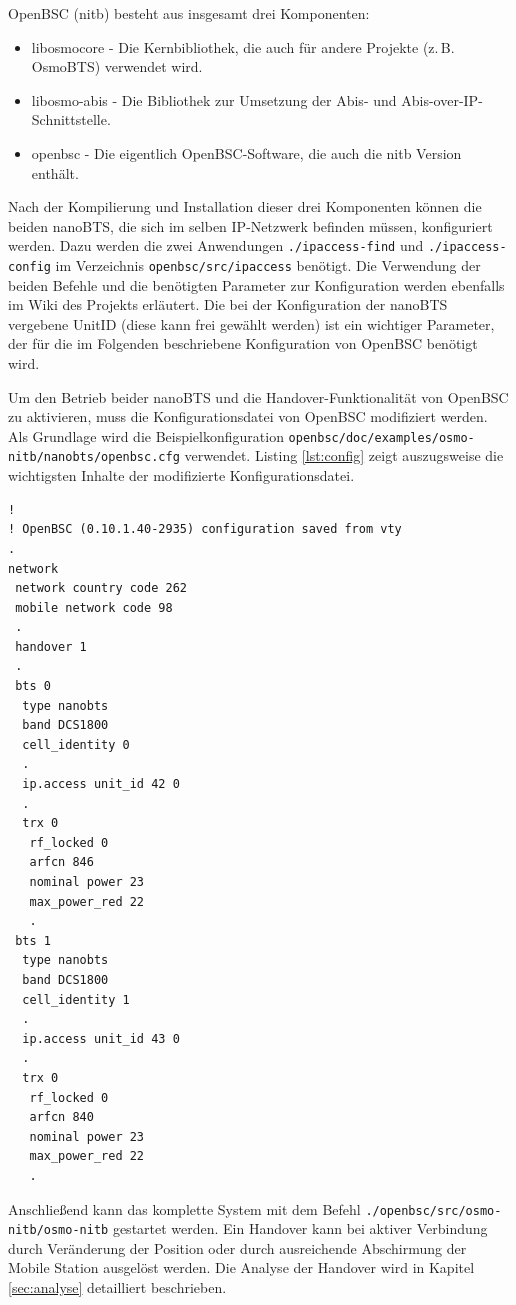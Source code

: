 OpenBSC (nitb) besteht aus insgesamt drei Komponenten:

\begin{itemize}
 \item libosmocore - Die Kernbibliothek, die auch für andere Projekte (z.\,B. OsmoBTS) verwendet wird.
 \item libosmo-abis - Die Bibliothek zur Umsetzung der Abis- und Abis-over-IP-Schnittstelle.
 \item openbsc - Die eigentlich OpenBSC-Software, die auch die nitb Version enthält.
\end{itemize}

Nach der Kompilierung und Installation dieser drei Komponenten können die beiden nanoBTS, die sich im selben IP-Netzwerk befinden müssen, konfiguriert werden. Dazu werden die zwei Anwendungen \lstinline{./ipaccess-find} und \lstinline{./ipaccess-config} im Verzeichnis \lstinline{openbsc/src/ipaccess} benötigt. Die Verwendung der beiden Befehle und die benötigten Parameter zur Konfiguration werden ebenfalls im Wiki des Projekts \cite{bib:ipaccess} erläutert. Die bei der Konfiguration der nanoBTS vergebene UnitID (diese kann frei gewählt werden) ist ein wichtiger Parameter, der für die im Folgenden beschriebene Konfiguration von OpenBSC benötigt wird.

Um den Betrieb beider nanoBTS und die Handover-Funktionalität von OpenBSC zu aktivieren, muss die Konfigurationsdatei von OpenBSC modifiziert werden. Als Grundlage wird die Beispielkonfiguration \lstinline{openbsc/doc/examples/osmo-nitb/nanobts/openbsc.cfg} verwendet. Listing \ref{lst:config} zeigt auszugsweise die wichtigsten Inhalte der modifizierte Konfigurationsdatei.

\begin{lstlisting}[label=lst:config,caption=OpenBSC Konfigurationsdatei (Auszug)]
!
! OpenBSC (0.10.1.40-2935) configuration saved from vty
.
network
 network country code 262
 mobile network code 98
 .
 handover 1
 .
 bts 0
  type nanobts
  band DCS1800
  cell_identity 0
  .
  ip.access unit_id 42 0
  .
  trx 0
   rf_locked 0
   arfcn 846
   nominal power 23
   max_power_red 22
   .
 bts 1
  type nanobts
  band DCS1800
  cell_identity 1
  .
  ip.access unit_id 43 0
  .
  trx 0
   rf_locked 0
   arfcn 840
   nominal power 23
   max_power_red 22
   .
\end{lstlisting}


Anschließend kann das komplette System mit dem Befehl \lstinline{./openbsc/src/osmo-nitb/osmo-nitb} gestartet werden. Ein Handover kann bei aktiver Verbindung durch Veränderung der Position oder durch ausreichende Abschirmung der Mobile Station ausgelöst werden. Die Analyse der Handover wird in Kapitel \ref{sec:analyse} detailliert beschrieben.
